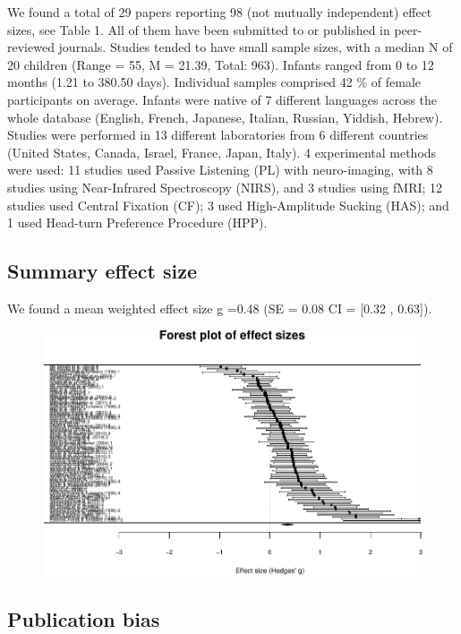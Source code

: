 \documentclass[man]{apa6}
\begin{document}
We found a total of 29 papers reporting 98 (not mutually independent)
effect sizes, see Table 1. All of them have been submitted to or
published in peer-reviewed journals. Studies tended to have small sample
sizes, with a median N of 20 children (Range = 55, M = 21.39, Total:
963). Infants ranged from 0 to 12 months (1.21 to 380.50 days).
Individual samples comprised 42 \% of female participants on average.
Infants were native of 7 different languages across the whole database
(English, French, Japanese, Italian, Russian, Yiddish, Hebrew). Studies
were performed in 13 different laboratories from 6 different countries
(United States, Canada, Israel, France, Japan, Italy). 4 experimental
methods were used: 11 studies used Passive Listening (PL) with
neuro-imaging, with 8 studies using Near-Infrared Spectroscopy (NIRS),
and 3 studies using fMRI; 12 studies used Central Fixation (CF); 3 used
High-Amplitude Sucking (HAS); and 1 used Head-turn Preference Procedure
(HPP).

\subsection{Summary effect size}\label{summary-effect-size}

We found a mean weighted effect size g =0.48 (SE = 0.08 CI = {[}0.32 ,
0.63{]}).

\begin{figure}
\centering
\includegraphics{MA_speech_pref_files/figure-latex/forest plot-1.pdf}
\caption{}
\end{figure}

\subsection{Publication bias}\label{publication-bias}
\end{document}

